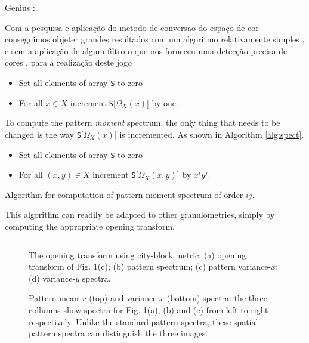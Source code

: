 \documentclass{sciposter}
\begin{document}
\begin{multicols}{3}
Genius :

Com a pesquisa e aplicação do metodo de conversao do espaço de cor conseguimos objeter grandes resultados com um algoritmo relativamente simples , e sem a aplicação de algum filtro 
o que nos forneceu uma detecção precisa de cores , para a realização deste jogo 
\begin{itemize}
\item Set all elements of array {\tt S} to zero
\item For all $x \in X$ increment {\tt S}[$\Omega_X(x)$] by one.
\end{itemize}

To compute the pattern \emph{moment} spectrum, the only thing that needs to be
changed is the way {\tt S}[$\Omega_X(x)$] is incremented. As shown in Algorithm
\ref{alg:spect}.

\begin{algorithm}
\begin{itemize}
\item Set all elements of array {\tt S} to zero
\item For all $(x,y) \in X$ increment {\tt S}[$\Omega_X(x,y)$] by
$x^iy^j$.
\end{itemize}
\caption{ Algorithm for computation of pattern moment
spectrum of order $ij$. \label{alg:spect}}
\end{algorithm}

This algorithm can
readily be adapted to other granulometries, simply by computing the
appropriate opening transform.

\begin{figure}
\begin{center}
\begin{tabular}{c c}

\end{tabular}
\end{center}
\caption{ \label{fig:tauspect}
The opening transform using city-block metric: (a) opening transform of
Fig. 1(c); (b) pattern spectrum; (c) pattern variance-$x$;
(d) variance-$y$ spectra.}
\end{figure}


\renewcommand{\imsize}{0.3\columnwidth}
\begin{figure}
\begin{center}
\end{center}
\caption{ \label{fig:binspect} Pattern mean-$x$ (top) and variance-$x$
(bottom) spectra: the three collumns show spectra for Fig. 1(a), (b) and (c)
from left to right respectively.  Unlike the standard pattern spectra,
these spatial pattern spectra can distinguish the three images.}
\end{figure}


\end{multicols}
\end{document}
